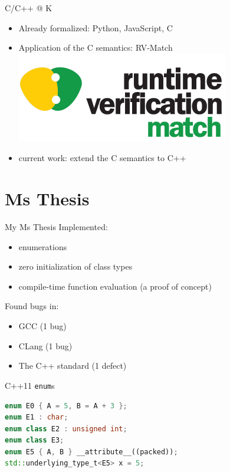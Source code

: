 \documentclass[11pt]{beamer}
\begin{document}
\begin{frame}{C/C++ @ K}
\begin{itemize}
\item Already formalized: Python, JavaScript, C
\pause \item Application of the C semantics: RV-Match \\
\includegraphics[width=0.3\linewidth]{img/rvmatch.png}
\pause \item current work: extend the C semantics to C++
\end{itemize}
\end{frame}

\section{Ms Thesis}

\begin{frame}{My Ms Thesis}
Implemented:
\begin{itemize}
\pause \item enumerations
\pause \item zero initialization of class types
\pause \item compile-time function evaluation (a proof of concept)
\end{itemize}
\pause
Found bugs in:
\begin{itemize}
\pause \item GCC (1 bug)
\pause \item CLang (1 bug)
\pause \item The C++ standard (1 defect)
\end{itemize}
\end{frame}


\begin{frame}[fragile]{C++11 \texttt{enum}s}
\begin{lstlisting}[language=C++]
enum E0 { A = 5, B = A + 3 };
enum E1 : char;
enum class E2 : unsigned int;
enum class E3;
enum E5 { A, B } __attribute__((packed));
std::underlying_type_t<E5> x = 5;
\end{lstlisting}
\end{frame}
\end{document}

